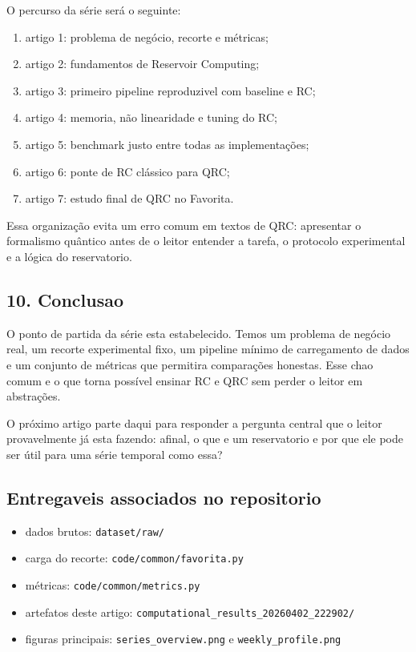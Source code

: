\documentclass[12pt]{article}
\providecommand{\tightlist}{%
          \setlength{\itemsep}{0pt}\setlength{\parskip}{0pt}}
\begin{document}
O percurso da série será o seguinte:

\begin{enumerate}
\def\labelenumi{\arabic{enumi}.}
\tightlist
\item
  artigo 1: problema de negócio, recorte e métricas;
\item
  artigo 2: fundamentos de Reservoir Computing;
\item
  artigo 3: primeiro pipeline reproduzivel com baseline e RC;
\item
  artigo 4: memoria, não linearidade e tuning do RC;
\item
  artigo 5: benchmark justo entre todas as implementações;
\item
  artigo 6: ponte de RC clássico para QRC;
\item
  artigo 7: estudo final de QRC no Favorita.
\end{enumerate}

Essa organização evita um erro comum em textos de QRC: apresentar o formalismo quântico antes de o leitor entender a tarefa, o protocolo experimental e a lógica do reservatorio.

\subsection{10. Conclusao}\label{10-conclusao}

O ponto de partida da série esta estabelecido. Temos um problema de negócio real, um recorte experimental fixo, um pipeline mínimo de carregamento de dados e um conjunto de métricas que permitira comparações honestas. Esse chao comum e o que torna possível ensinar RC e QRC sem perder o leitor em abstrações.

O próximo artigo parte daqui para responder a pergunta central que o leitor provavelmente já esta fazendo: afinal, o que e um reservatorio e por que ele pode ser útil para uma série temporal como essa?

\subsection{Entregaveis associados no repositorio}\label{entregaveis-associados-no-repositorio}

\begin{itemize}
\tightlist
\item
  dados brutos: \texttt{dataset/raw/}
\item
  carga do recorte: \texttt{code/common/favorita.py}
\item
  métricas: \texttt{code/common/metrics.py}
\item
  artefatos deste artigo: \texttt{computational\_results\_20260402\_222902/}
\item
  figuras principais: \texttt{series\_overview.png} e \texttt{weekly\_profile.png}
\end{itemize}
\end{document}
